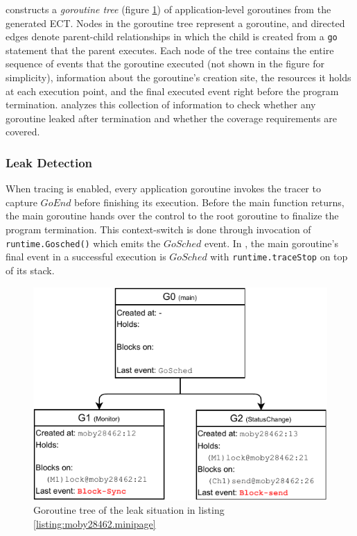 \goat constructs a \textit{goroutine tree} (figure \ref{fig:gtree}) of application-level goroutines from the generated ECT.
%
Nodes in the goroutine tree represent a goroutine, and directed edges denote parent-child relationships in which the child is created from a \texttt{go} statement that the parent executes.
%
Each node of the tree contains the entire sequence of events that the goroutine executed (not shown in the figure for simplicity), information about the goroutine's creation site, the resources it holds at each execution point, and the final executed event right before the program termination.
%
\goat analyzes this collection of information to check whether any goroutine leaked after termination and whether the coverage requirements are covered.

\subsubsection{Leak Detection}
When tracing is enabled, every application goroutine invokes the tracer to capture $GoEnd$ before finishing its execution.
%
Before the main function returns, the main goroutine hands over the control to the root goroutine to finalize the program termination.
%
This context-switch is done through invocation of \texttt{runtime.Gosched()} which emits the $GoSched$ event.
%
In \goat, the main goroutine's final event in a successful execution is $GoSched$ with \texttt{runtime.traceStop} on top of its stack.

\begin{figure}[]
\centering
\includegraphics[width=0.75\linewidth]{figs/gtree.pdf}
\caption{Goroutine tree of the leak situation in listing \ref{listing:moby28462.minipage}}
\label{fig:gtree}
\end{figure}

